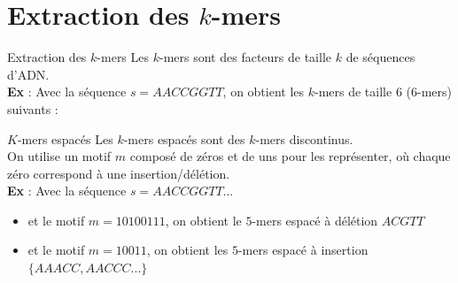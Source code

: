 \documentclass[11pt]{beamer}
\begin{document}
\section{Extraction des $k$-mers}
\begin{frame}[fragile]{Extraction des $k$-mers}
  Les $k$-mers sont des facteurs de taille $k$ de séquences d'ADN.\medskip\\\pause
  \textbf{Ex} : Avec la séquence $s = AACCGGTT$, on obtient les $k$-mers de taille $6$ ($6$-mers) suivants :\\\pause
  \begin{center}\end{center}
  \pause
\end{frame}
\begin{frame}[fragile]{$K$-mers espacés}
  Les $k$-mers espacés sont des $k$-mers discontinus.\pause\medskip\\
  On utilise un motif $m$ composé de zéros et de uns pour les représenter, où chaque zéro correspond à une insertion/délétion.\medskip\pause\\
  \textbf{Ex} : Avec la séquence $s=AACCGGTT$...\pause
  \begin{itemize}[<+-| alert@+>]
    \item et le motif $m=10100111$, on obtient le $5$-mers espacé à délétion $ACGTT$
    \item et le motif $m=10011$, on obtient les $5$-mers espacé à insertion $\{AAACC, AACCC...\}$
  \end{itemize}
\end{frame}
\end{document}
